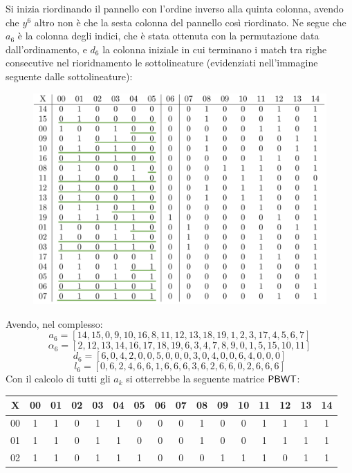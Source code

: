 \begin{esempio}
\begin{table}[H]
\begin{tabular}{c|ccccccccccccccc}
    \end{tabular}
  \end{table}
  Si inizia riordinando il pannello con l'ordine inverso alla
  quinta colonna, avendo che $y^6$ altro non è che la sesta colonna del pannello
  così riordinato. Ne segue che $a_6$ è la colonna degli indici, che è stata
  ottenuta con la permutazione data dall'ordinamento, e $d_6$ la
  colonna iniziale in cui terminano i match tra righe consecutive nel
  rioridnamento le sottolineature (evidenziati nell'immagine seguente dalle
  sottolineature):   
  \begin{figure}[H]
    \centering
    \includegraphics[scale = 0.315]{img/matrix1.pdf}
  \end{figure}
  \noindent
  Avendo, nel complesso:
  \[a_6=[14,15,0,9,10,16,8,11,12,13,18,19,1,2,3,17,4,5,6,7]\]
  \[\alpha_6=[2,12,13,14,16,17,18,19,6,3,4,7,8,9,0,1,5,15,10,11]\]
  \[d_6=[6,0,4,2,0,0,5,0,0,0,3,0,4,0,0,6,4,0,0,0]\]
  \[l_6=[0,6,2,4,6,6,1,6,6,6,3,6,2,6,6,0,2,6,6,6]\]
  Con il calcolo di tutti gli $a_k$ si otterrebbe la seguente matrice $\mbox{\rm {\sf PBWT}}$:
  \begin{table}[H]
  \centering
  \scriptsize
  \begin{tabular}{c|ccccccccccccccc}
    X & 00 & 01 & 02 & 03 & 04 & 05 & 06 & 07 & 08 & 09 & 10 & 11 & 12 & 13
    & 14 \\
    \hline
    00 & 1 & 1 & 0 & 1 & 1 & 0 & 0 & 0 & 1 & 0 & 0 & 1 & 1 & 1 & 1 \\
    01 & 1 & 1 & 0 & 1 & 1 & 0 & 0 & 0 & 1 & 0 & 0 & 1 & 1 & 1 & 1 \\
    02 & 1 & 1 & 0 & 1 & 1 & 1 & 0 & 0 & 0 & 1 & 1 & 1 & 0 & 1 & 1 \\

\end{tabular}
\end{table}
\end{esempio}
